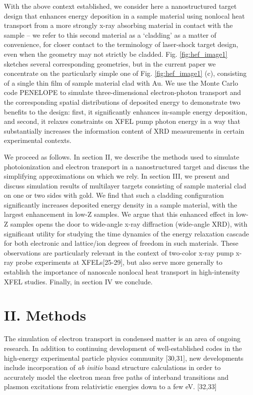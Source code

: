 With the above context established, we consider here a nanostructured
target design that enhances energy deposition in a sample material using
nonlocal heat transport from a more strongly x-ray absorbing material in
contact with the sample -- we refer to this second material as a
`cladding' as a matter of convenience, for closer contact to the
terminology of laser-shock target design, even when the geometry may not
strictly be cladded. Fig. \ref{fig:hef_image1} sketches several corresponding geometries,
but in the current paper we concentrate on the particularly simple one
of Fig. \ref{fig:hef_image1} (c), consisting of a single thin film of sample material clad
with Au. We use the Monte Carlo code PENELOPE to simulate
three-dimensional electron-photon transport and the corresponding
spatial distributions of deposited energy to demonstrate two benefits to
the design: first, it significantly enhances in-sample energy
deposition, and second, it relaxes constraints on XFEL pump photon
energy in a way that substantially increases the information content of
XRD measurements in certain experimental contexts.

We proceed as follows. In section II, we describe the methods used to
simulate photoionization and electron transport in a nanostructured
target and discuss the simplifying approximations on which we rely. In
section III, we present and discuss simulation results of multilayer
targets consisting of sample material clad on one or two sides with
gold. We find that such a cladding configuration significantly increases
deposited energy density in a sample material, with the largest
enhancement in low-Z samples. We argue that this enhanced effect in
low-Z samples opens the door to wide-angle x-ray diffraction (wide-angle
XRD), with significant utility for studying the time dynamics of the
energy relaxation cascade for both electronic and lattice/ion degrees of
freedom in such materials. These observations are particularly relevant
in the context of two-color x-ray pump x-ray probe experiments at
XFELs{[}25-29{]}, but also serve more generally to establish the
importance of nanoscale nonlocal heat transport in high-intensity XFEL
studies. Finally, in section IV we conclude.

\section{II. Methods}

The simulation of electron transport in condensed matter is an area of
ongoing research. In addition to continuing development of
well-established codes in the high-energy experimental particle physics
community {[}30,31{]}, new developments include incorporation of
\emph{ab initio} band structure calculations in order to accurately
model the electron mean free paths of interband transitions and plasmon
excitations from relativistic energies down to a few eV. {[}32,33{]}

